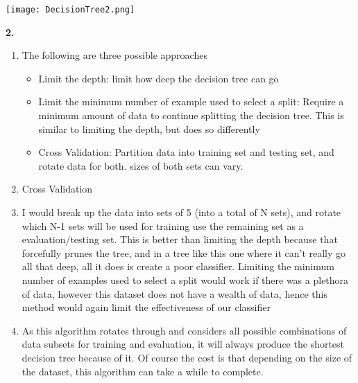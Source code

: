\documentclass[titlepage]{article}
\begin{document}
\centerline{\texttt{[image: DecisionTree2.png]}}

\pagebreak

\noindent \textbf{2. } \\

\begin{enumerate}[label=(\alph*)]
	\item The following are three possible approaches
	\begin{itemize}
		\item Limit the depth: limit how deep the decision tree can go
		\item Limit the minimum number of example used to select a split: Require a minimum amount of data to continue splitting the decision tree. This is similar to limiting the depth, but does so differently
		\item Cross Validation: Partition data into training set and testing set, and rotate data for both. sizes of both sets can vary.
	\end{itemize}
	\item Cross Validation
	\item I would break up the data into sets of 5 (into a total of N sets), and rotate which N-1 sets will be used for training use the remaining set as a evaluation/testing set. This is better than limiting the depth because that forcefully prunes the tree, and in a tree like this one where it can't really go all that deep, all it does is create a poor classifier. Limiting the minimum number of examples used to select a split would work if there was a plethora of data, however this dataset does not have a wealth of data, hence this method would again limit the effectiveness of our classifier
	\item As this algorithm rotates through and considers all possible combinations of data subsets for training and evaluation, it will always produce the shortest decision tree because of it. Of course the cost is that depending on the size of the dataset, this algorithm can take a while to complete.
\end{enumerate}
\end{document}
